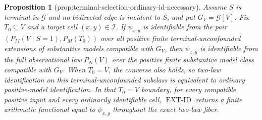\documentclass{article}
\newtheorem{proposition}{Proposition}
\begin{document}
\begin{proposition}[prop:terminal-selection-ordinary-id-necessary]\label{prop:terminal-selection-ordinary-id-necessary}
Assume \(S\) is terminal in \(\mathcal G\) and no bidirected edge is incident to \(S\), and put \(G_V=\mathcal G[V]\). Fix \(T_0\subseteq V\) and a target cell \((x,y)\in\mathcal I\). If \(\psi_{x,y}\) is identifiable from the pair \((P_M(V\mid S=1),P_M(T_0))\) over all positive finite terminal-unconfounded extensions of substantive models compatible with \(G_V\), then \(\psi_{x,y}\) is identifiable from the full observational law \(P_N(V)\) over the positive finite substantive model class compatible with \(G_V\). When \(T_0=V\), the converse also holds, so two-law identification on this terminal-unconfounded subclass is equivalent to ordinary positive-model identification. In that \(T_0=V\) boundary, for every compatible positive input and every ordinarily identifiable cell, \(\operatorname{EXT\text{-}ID}\) returns a finite arithmetic functional equal to \(\psi_{x,y}\) throughout the exact two-law fiber.
\end{proposition}
\end{document}
